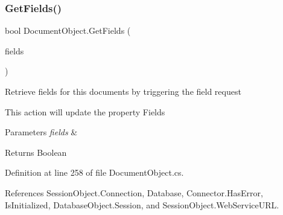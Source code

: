 \subsubsection{\texorpdfstring{Get\+Fields()}{GetFields()}\hspace{0.1cm}{\footnotesize\ttfamily [2/2]}}
{\footnotesize\ttfamily bool Document\+Object.\+Get\+Fields (\begin{DoxyParamCaption}\item[{I\+List}]{fields }\end{DoxyParamCaption})}



Retrieve fields for this documents by triggering the field request 

This action will update the property \textquotesingle{}Fields\textquotesingle{}


\begin{DoxyParams}{Parameters}
{\em fields} & \\
\hline
\end{DoxyParams}
\begin{DoxyReturn}{Returns}
Boolean
\end{DoxyReturn}


Definition at line 258 of file Document\+Object.\+cs.



References Session\+Object.\+Connection, Database, Connector.\+Has\+Error, Is\+Initialized, Database\+Object.\+Session, and Session\+Object.\+Web\+Service\+U\+RL.


